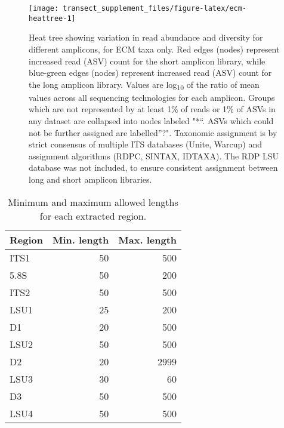 \documentclass[
]{article}
\begin{document}
\begin{figure}

{\centering \texttt{[image: transect\_supplement\_files/figure-latex/ecm-heattree-1]} 

}

\caption[Heat tree showing variation in read abundance and diversity for different amplicons, for ECM taxa only]{Heat tree showing variation in read abundance and diversity for different amplicons, for ECM taxa only. Red edges (nodes) represent increased read (ASV) count for the short amplicon library, while blue-green edges (nodes) represent increased read (ASV) count for the long amplicon library.
Values are log\textsubscript{10} of the ratio of mean values across all sequencing technologies for each amplicon.
Groups which are not represented by at least 1\% of reads or 1\% of ASVs in any dataset are collapsed into nodes labeled "*``.
ASVs which could not be further assigned are labelled''?".
Taxonomic assignment is by strict consensus of multiple ITS databases (Unite, Warcup) and assignment algorithms (RDPC, SINTAX, IDTAXA).
The RDP LSU database was not included, to ensure consistent assignment between long and short amplicon libraries.}\label{fig:ecm-heattree}
\end{figure}

\begin{table}

\caption{\label{tab:region-limits}Minimum and maximum allowed lengths for each extracted region.}
\centering
\begin{tabular}[t]{lrr}
\toprule
Region & Min. length & Max. length\\
\midrule
ITS1 & 50 & 500\\
5.8S & 50 & 200\\
ITS2 & 50 & 500\\
LSU1 & 25 & 200\\
D1 & 20 & 500\\
\addlinespace
LSU2 & 50 & 500\\
D2 & 20 & 2999\\
LSU3 & 30 & 60\\
D3 & 50 & 500\\
LSU4 & 50 & 500\\
\bottomrule
\end{tabular}
\end{table}
\end{document}
